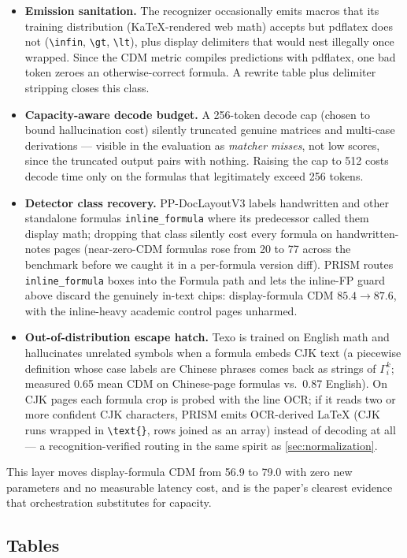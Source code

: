 \begin{itemize}
\item \textbf{Emission sanitation.} The recognizer occasionally emits macros that its training distribution (KaTeX-rendered web math) accepts but pdflatex does not (\verb|\infin|, \verb|\gt|, \verb|\lt|), plus display delimiters that would nest illegally once wrapped. Since the CDM metric compiles predictions with pdflatex, one bad token zeroes an otherwise-correct formula. A rewrite table plus delimiter stripping closes this class.
\item \textbf{Capacity-aware decode budget.} A 256-token decode cap (chosen to bound hallucination cost) silently truncated genuine matrices and multi-case derivations --- visible in the evaluation as \emph{matcher misses}, not low scores, since the truncated output pairs with nothing. Raising the cap to 512 costs decode time only on the formulas that legitimately exceed 256 tokens.
\item \textbf{Detector class recovery.} PP-DocLayoutV3 labels handwritten and other standalone formulas \texttt{inline\_formula} where its predecessor called them display math; dropping that class silently cost every formula on handwritten-notes pages (near-zero-CDM formulas rose from 20 to 77 across the benchmark before we caught it in a per-formula version diff). PRISM routes \texttt{inline\_formula} boxes into the Formula path and lets the inline-FP guard above discard the genuinely in-text chips: display-formula CDM $85.4 \rightarrow 87.6$, with the inline-heavy academic control pages unharmed.
\item \textbf{Out-of-distribution escape hatch.} Texo is trained on English math and hallucinates unrelated symbols when a formula embeds CJK text (a piecewise definition whose case labels are Chinese phrases comes back as strings of $\Gamma_i^k$; measured 0.65 mean CDM on Chinese-page formulas vs.\ 0.87 English). On CJK pages each formula crop is probed with the line OCR; if it reads two or more confident CJK characters, PRISM emits OCR-derived \LaTeX{} (CJK runs wrapped in \verb|\text{}|, rows joined as an array) instead of decoding at all --- a recognition-verified routing in the same spirit as \cref{sec:normalization}.
\end{itemize}

This layer moves display-formula CDM from 56.9 to 79.0 with zero new parameters and no measurable latency cost, and is the paper's clearest evidence that orchestration substitutes for capacity.

\subsection{Tables}
\label{sec:tables}

